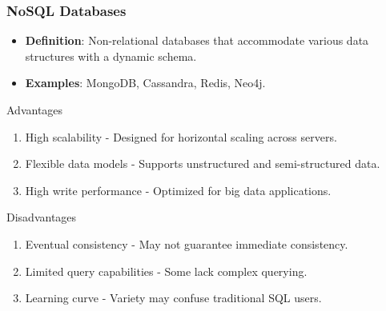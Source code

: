 \documentclass[aspectratio=169]{beamer}
\begin{document}
\begin{frame}[fragile]
    \frametitle{NoSQL Databases}
    \begin{itemize}
        \item \textbf{Definition}: Non-relational databases that accommodate various data structures with a dynamic schema.
        \item \textbf{Examples}: MongoDB, Cassandra, Redis, Neo4j.
    \end{itemize}

    \begin{block}{Advantages}
        \begin{enumerate}
            \item High scalability - Designed for horizontal scaling across servers.
            \item Flexible data models - Supports unstructured and semi-structured data.
            \item High write performance - Optimized for big data applications.
        \end{enumerate}
    \end{block}

    \begin{block}{Disadvantages}
        \begin{enumerate}
            \item Eventual consistency - May not guarantee immediate consistency.
            \item Limited query capabilities - Some lack complex querying.
            \item Learning curve - Variety may confuse traditional SQL users.
        \end{enumerate}
    \end{block}
\end{frame}
\end{document}
